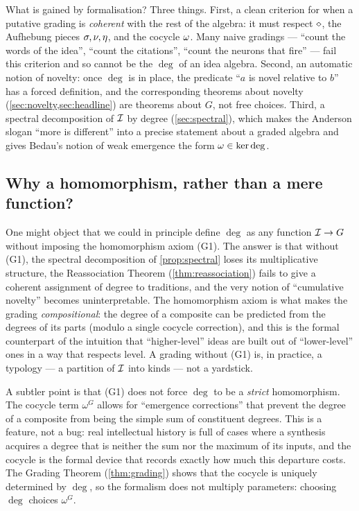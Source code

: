 What is gained by formalisation? Three things. First, a clean criterion
for when a putative grading is \emph{coherent} with the rest of the
algebra: it must respect $\mathbin{\diamond}$, the Aufhebung pieces $\sigma,
\nu, \eta$, and the cocycle $\omega$. Many naive gradings ---
``count the words of the idea'', ``count the citations'', ``count the
neurons that fire'' --- fail this criterion and so cannot be the
$\deg$ of an idea algebra. Second, an automatic notion of novelty: once
$\deg$ is in place, the predicate ``$a$ is novel relative to $b$'' has
a forced definition, and the corresponding theorems about novelty
(\cref{sec:novelty,sec:headline}) are theorems about $G$, not free
choices. Third, a spectral decomposition of $\mathcal{I}$ by degree
(\cref{sec:spectral}), which makes the Anderson slogan ``more is
different'' \cite{Anderson1972} into a precise statement about a graded
algebra and gives Bedau's notion of weak emergence \cite{Bedau1997} the
form $\omega \in \ker \deg$.

\subsection*{Why a homomorphism, rather than a mere function?}

One might object that we could in principle define $\deg$ as any
function $\mathcal{I} \to G$ without imposing the homomorphism axiom (G1).
The answer is that without (G1), the spectral decomposition of
\cref{prop:spectral} loses its multiplicative structure, the
Reassociation Theorem (\cref{thm:reassociation}) fails to give a
coherent assignment of degree to traditions, and the very notion of
``cumulative novelty'' becomes uninterpretable. The homomorphism
axiom is what makes the grading \emph{compositional}: the degree of a
composite can be predicted from the degrees of its parts (modulo a
single cocycle correction), and this is the formal counterpart of the
intuition that ``higher-level'' ideas are built out of ``lower-level''
ones in a way that respects level. A grading without (G1) is, in
practice, a typology --- a partition of $\mathcal{I}$ into kinds --- not a
yardstick.

A subtler point is that (G1) does not force $\deg$ to be a
\emph{strict} homomorphism. The cocycle term $\omega^G$ allows for
``emergence corrections'' that prevent the degree of a composite from
being the simple sum of constituent degrees. This is a feature, not a
bug: real intellectual history is full of cases where a synthesis
acquires a degree that is neither the sum nor the maximum of its
inputs, and the cocycle is the formal device that records exactly how
much this departure costs. The Grading Theorem
(\cref{thm:grading}) shows that the cocycle is uniquely determined by
$\deg$, so the formalism does not multiply parameters: choosing
$\deg$ choices $\omega^G$.

